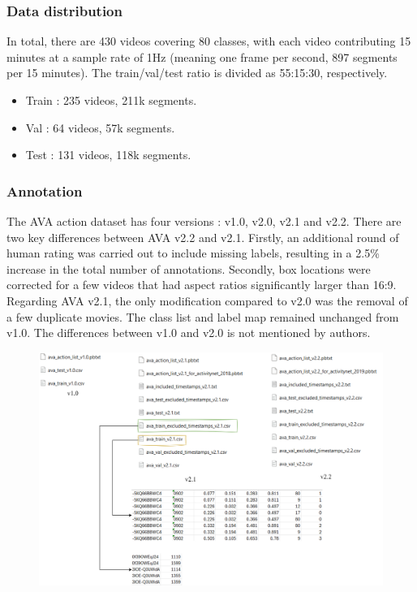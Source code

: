 \documentclass[10pt,onecolumn,letterpaper]{article}
\begin{document}
\subsubsection{Data distribution}
	
	In total, there are 430 videos covering 80 classes, with each video contributing 15 minutes at a sample rate of 1Hz (meaning one frame per second, 897 segments per 15 minutes). The train/val/test ratio is divided as 55:15:30, respectively.
	\begin{itemize}
		\item Train : 235 videos, 211k segments.
		\item Val : 64 videos, 57k segments.
		\item Test : 131 videos, 118k segments.
	\end{itemize}
	
\subsubsection{Annotation}

The AVA action dataset has four versions : v1.0, v2.0, v2.1 and v2.2. There are two key differences between AVA v2.2 and v2.1. Firstly, an additional round of human rating was carried out to include missing labels, resulting in a 2.5\% increase in the total number of annotations. Secondly, box locations were corrected for a few videos that had aspect ratios significantly larger than 16:9. Regarding AVA v2.1, the only modification compared to v2.0 was the removal of a few duplicate movies. The class list and label map remained unchanged from v1.0. The differences between v1.0 and v2.0 is not mentioned by authors.

\begin{figure}[h]
	\centering
	\includegraphics[width=0.7\linewidth]{"fig_info/fig3/Untitled Diagram.drawio"}
	\caption{}
	\label{fig:untitled-diagram2}
\end{figure}
\end{document}
